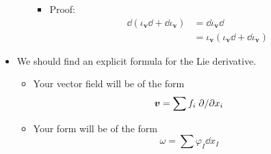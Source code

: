 \documentclass[../notes.tex]{subfiles}
\begin{document}
\begin{itemize}
\begin{enumerate}
        \begin{itemize}
            \item Proof:
            \begin{align*}
                \dd(\iota_{\bm{v}}\dd+\dd\iota_{\bm{v}}) &= \dd\iota_{\bm{v}}\dd\\
                &= \iota_{\bm{v}}(\iota_{\bm{v}}\dd+\dd\iota_{\bm{v}})
            \end{align*}
        \end{itemize}
    \end{enumerate}
    \item We should find an explicit formula for the Lie derivative.
    \begin{itemize}
        \item Your vector field will be of the form
        \begin{equation*}
            \bm{v} = \sum f_i\pdv*{x_i}
        \end{equation*}
        \item Your form will be of the form
        \begin{equation*}
            \omega = \sum\varphi_I\dd{x_I}
        \end{equation*}
    \end{itemize}
\end{itemize}
\end{document}
